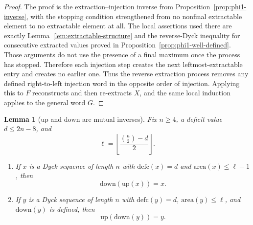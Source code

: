 \documentclass[11pt]{article}
\theoremstyle{plain}
\newtheorem{lemma}[theorem]{Lemma}
\theoremstyle{definition}
\theoremstyle{remark}
\newcommand{\area}{\mathrm{area}}
\newcommand{\defc}{\mathrm{defc}}
\begin{document}
\begin{proof}
The proof is the extraction--injection inverse from
Proposition~\ref{prop:phi1-inverse}, with the stopping condition strengthened
from no nonfinal extractable element to no extractable element at all.  The
local assertions used there are exactly Lemma~\ref{lem:extractable-structure}
and the reverse-Dyck inequality for consecutive extracted values proved in
Proposition~\ref{prop:phi1-well-defined}.  Those arguments do not use the
presence of a final maximum once the process has stopped.  Therefore each
injection step creates the next leftmost-extractable entry and creates no
earlier one.  Thus the reverse extraction process removes any defined
right-to-left injection word in the opposite order of injection.  Applying this
to \(F\) reconstructs and then re-extracts \(X\), and the same local induction
applies to the general word \(G\).
\end{proof}

\begin{lemma}[\(\mathrm{up}\) and \(\mathrm{down}\) are mutual inverses]
\label{lem:up-down-inv}
Fix \(n\ge 4\), a deficit value \(d\le 2n-8\), and
\[
  \ell=\left\lfloor\frac{\binom n2-d}{2}\right\rfloor .
\]
\begin{enumerate}[label=\textup{(\roman*)}]
  \item If \(x\) is a Dyck sequence of length \(n\) with \(\defc(x)=d\) and
  \(\area(x)\le \ell-1\), then
  \[
    \mathrm{down}(\mathrm{up}(x))=x.
  \]

  \item If \(y\) is a Dyck sequence of length \(n\) with \(\defc(y)=d\),
  \(\area(y)\le \ell\), and \(\mathrm{down}(y)\) is defined, then
  \[
    \mathrm{up}(\mathrm{down}(y))=y.
  \]
\end{enumerate}
\end{lemma}
\end{document}
